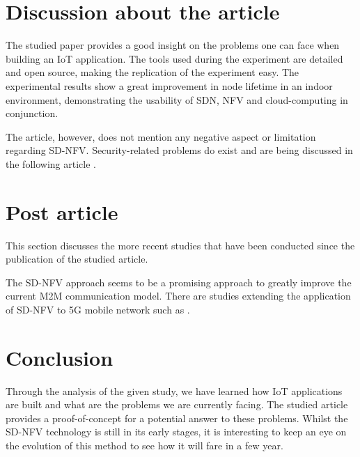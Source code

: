\documentclass[10pt,journal,compsoc]{IEEEtran}
\begin{document}
\section{Discussion about the article}

The studied paper provides a good insight on the problems one can face 
when building an IoT application. The tools used during the experiment 
are detailed and open source, making the replication of the experiment 
easy. The experimental results show a great improvement in node lifetime 
in an indoor environment, demonstrating the usability of SDN, NFV and 
cloud-computing in conjunction.

The article, however, does not mention any negative aspect or limitation 
regarding SD-NFV. Security-related problems do exist and are being 
discussed in the following article \cite{deqing}.

\section{Post article}

This section discusses the more recent studies that have been conducted 
since the publication of the studied article.

The SD-NFV approach seems to be a promising approach to greatly improve 
the current M2M communication model. There are studies extending 
the application of SD-NFV to 5G mobile network such as \cite{5g}. 

\section{Conclusion}\label{sec:conclusion}

Through the analysis of the given study, we have learned how IoT 
applications are built and what are the problems we are currently facing. 
The studied article provides a proof-of-concept for a potential 
answer to these problems. Whilst the SD-NFV technology is still in its 
early stages, it is interesting to keep an eye on the evolution of 
this method to see how it will fare in a few year.
\end{document}
